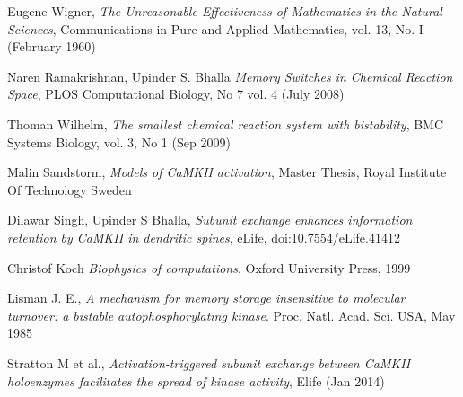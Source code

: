 \documentclass[]{resonance}
\begin{document}
\begin{thebibliography}{99} 

    Eugene Wigner,
    \textit{The Unreasonable Effectiveness of Mathematics in the Natural Sciences},
     Communications in Pure and Applied Mathematics, vol. 13, No. I (February 1960)

    Naren Ramakrishnan, Upinder S. Bhalla
    \textit{Memory Switches in Chemical Reaction Space},
    PLOS Computational Biology, No 7 vol. 4 (July 2008)

    Thoman Wilhelm,
    \textit{The smallest chemical reaction system with bistability},
    BMC Systems Biology, vol. 3, No 1 (Sep 2009)

    Malin Sandstorm,
    \textit{Models of CaMKII activation},
    Master Thesis, Royal Institute Of Technology Sweden 

    Dilawar Singh, Upinder S Bhalla,
    \textit{Subunit exchange enhances information retention by CaMKII in dendritic spines},
    eLife, doi:10.7554/eLife.41412

    Christof Koch
    \textit{Biophysics of computations}.
    Oxford University Press, 1999

    Lisman J. E., 
    \textit{A mechanism for memory storage insensitive to molecular turnover: a
    bistable autophosphorylating kinase}. 
    Proc. Natl. Acad. Sci. USA, May 1985


    Stratton M et al.,
    \textit{Activation-triggered subunit exchange between CaMKII holoenzymes
    facilitates the spread of kinase activity}, Elife (Jan 2014) 

\end{thebibliography}
\end{document}
